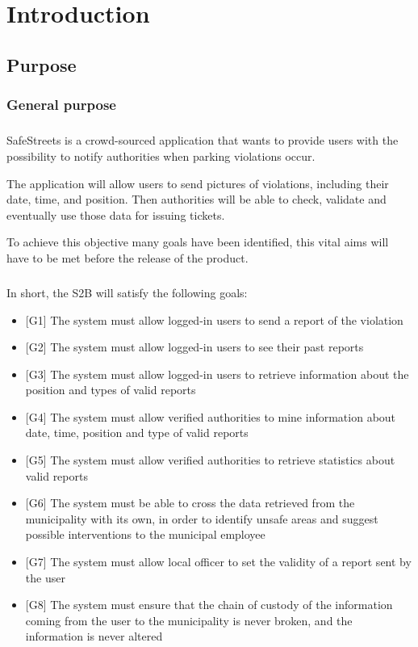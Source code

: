 	\chapter{Introduction}
		\section{Purpose}
			\subsection{General purpose}
				\paragraph{}
					SafeStreets is a crowd-sourced application that wants to provide users with the possibility to notify authorities when parking violations occur. 
					
					The application will allow users to send pictures of violations, including their date, time, and position. Then authorities will be able to check, validate and eventually use those data for issuing tickets.
					
					 To achieve this objective many goals have been identified, this vital aims will have to be met before the release of the product.
				\paragraph{}
					In short, the S2B will satisfy the following goals:
					 \begin{itemize}
					 	\item {[G1]} The system must allow logged-in users to send a report of the violation
					 	\item {[G2]} The system must allow logged-in users to see their past reports
					 	\item {[G3]} The system must allow logged-in users to retrieve information about the position and types of valid reports
					 	\item {[G4]} The system must allow verified authorities to mine information about date, time, position and type of valid reports
					 	\item {[G5]} The system must allow verified authorities to retrieve statistics about valid reports
					 	\item {[G6]} The system must be able to cross the data retrieved from the municipality with its own, in order to identify unsafe areas and suggest possible interventions to the municipal employee
					 	\item {[G7]} The system must allow local officer to set the validity of a report sent by the user
					 	\item {[G8]} The system must ensure that the chain of custody of the information coming from the user to the municipality is never broken, and the information is never altered
					 \end{itemize}
					 

